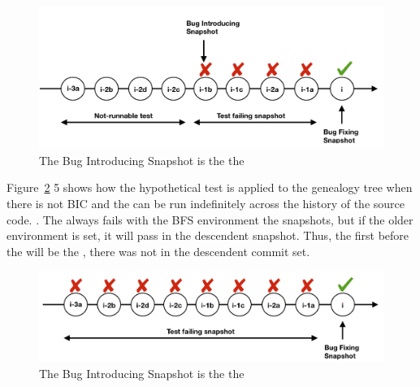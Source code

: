 \documentclass[a4paper, 12pt]{book}
\begin{document}
\begin{figure}[ht]
\centering
\includegraphics[width=\columnwidth]{img/snapshot2.png}
\caption{The Bug Introducing Snapshot is the the \FFC }
\label{fig:snapshot2}       %
\end{figure}

Figure~\ref{fig:snapshot3} 5 shows how the hypothetical test is applied to the genealogy tree when there is not BIC and the \TSB can be run indefinitely across the history of the source code. . The \TSB always fails with the BFS environment the snapshots, but if the older environment is set, it will pass in the descendent snapshot. Thus, the first \BIS before the \BFC will be the \FFC, there was not \BIC in the descendent commit set.
\begin{figure}[ht]
\centering
\includegraphics[width=\columnwidth]{img/snapshot3.png}
\caption{The Bug Introducing Snapshot is the the \FFC }
\label{fig:snapshot3}       %
\end{figure}
\end{document}
